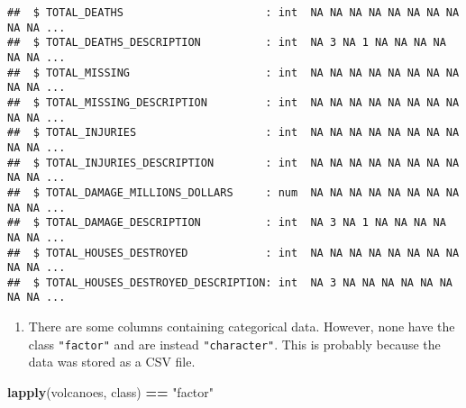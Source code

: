 \documentclass[
]{article}
\newenvironment{Shaded}{\begin{snugshade}}{\end{snugshade}}
\newcommand{\KeywordTok}[1]{\textcolor[rgb]{0.13,0.29,0.53}{\textbf{#1}}}
\newcommand{\NormalTok}[1]{#1}
\newcommand{\OperatorTok}[1]{\textcolor[rgb]{0.81,0.36,0.00}{\textbf{#1}}}
\newcommand{\StringTok}[1]{\textcolor[rgb]{0.31,0.60,0.02}{#1}}
\providecommand{\tightlist}{%
  \setlength{\itemsep}{0pt}\setlength{\parskip}{0pt}}
\begin{document}
\begin{verbatim}
##  $ TOTAL_DEATHS                      : int  NA NA NA NA NA NA NA NA NA NA ...
##  $ TOTAL_DEATHS_DESCRIPTION          : int  NA 3 NA 1 NA NA NA NA NA NA ...
##  $ TOTAL_MISSING                     : int  NA NA NA NA NA NA NA NA NA NA ...
##  $ TOTAL_MISSING_DESCRIPTION         : int  NA NA NA NA NA NA NA NA NA NA ...
##  $ TOTAL_INJURIES                    : int  NA NA NA NA NA NA NA NA NA NA ...
##  $ TOTAL_INJURIES_DESCRIPTION        : int  NA NA NA NA NA NA NA NA NA NA ...
##  $ TOTAL_DAMAGE_MILLIONS_DOLLARS     : num  NA NA NA NA NA NA NA NA NA NA ...
##  $ TOTAL_DAMAGE_DESCRIPTION          : int  NA 3 NA 1 NA NA NA NA NA NA ...
##  $ TOTAL_HOUSES_DESTROYED            : int  NA NA NA NA NA NA NA NA NA NA ...
##  $ TOTAL_HOUSES_DESTROYED_DESCRIPTION: int  NA 3 NA NA NA NA NA NA NA NA ...
\end{verbatim}

\begin{enumerate}
\def\labelenumi{\arabic{enumi}.}
\setcounter{enumi}{4}
\tightlist
\item
  There are some columns containing categorical data. However, none have
  the class \texttt{"factor"} and are instead \texttt{"character"}. This
  is probably because the data was stored as a CSV file.
\end{enumerate}

\begin{Shaded}
\begin{Highlighting}[]
\KeywordTok{lapply}\NormalTok{(volcanoes, class) }\OperatorTok{==}\StringTok{ "factor"}
\end{Highlighting}
\end{Shaded}
\end{document}
